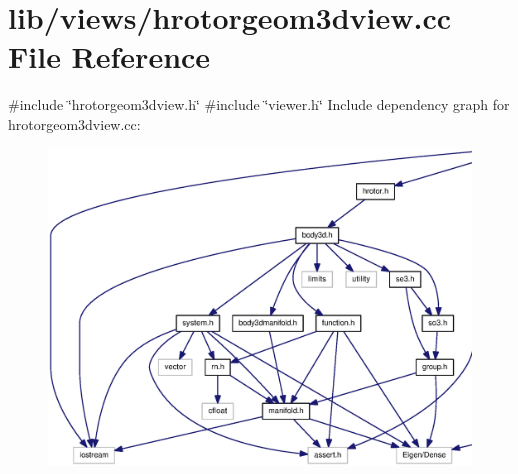 \section{lib/views/hrotorgeom3dview.cc \-File \-Reference}
\label{hrotorgeom3dview_8cc}
{\ttfamily \#include \char`\"{}hrotorgeom3dview.\-h\char`\"{}}\*
{\ttfamily \#include \char`\"{}viewer.\-h\char`\"{}}\*
\-Include dependency graph for hrotorgeom3dview.\-cc\-:\nopagebreak
\begin{figure}[H]
\begin{center}
\leavevmode
\includegraphics[width=350pt]{hrotorgeom3dview_8cc__incl}
\end{center}
\end{figure}
